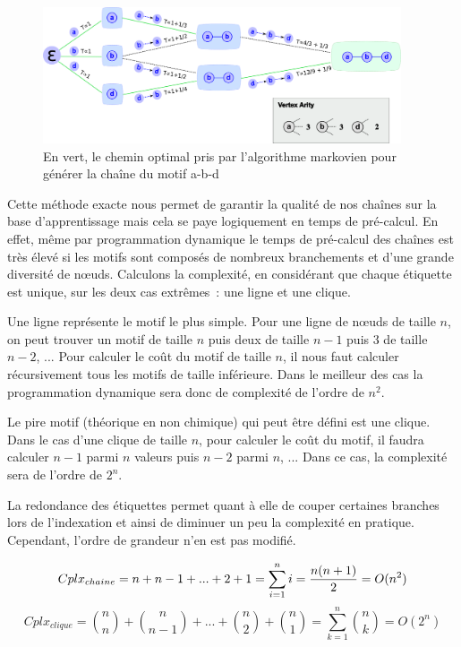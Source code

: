 \begin{figure}[!ht]
  \begin{center}
    \includegraphics[width=400px]{Figures/s2m/indexation/markov.png}
    \caption{\label{markov}En vert, le chemin optimal pris par l'algorithme markovien pour générer la chaîne du motif a-b-d}
  \end{center}
\end{figure}

Cette méthode exacte nous permet de garantir la qualité de nos chaînes sur la base d'apprentissage mais cela se paye logiquement en temps de pré-calcul.
En effet, même par programmation dynamique le temps de pré-calcul des chaînes est très élevé si les motifs sont composés de nombreux branchements et d'une grande diversité de n\oe{}uds.
Calculons la complexité, en considérant que chaque étiquette est unique, sur les deux cas extrêmes~: une ligne et une clique.

Une ligne représente le motif le plus simple.
Pour une ligne de n\oe{}uds de taille $n$, on peut trouver un motif de taille $n$ puis deux de taille $n-1$ puis 3 de taille $n-2$, ...
Pour calculer le coût du motif de taille $n$, il nous faut calculer récursivement tous les motifs de taille inférieure.
Dans le meilleur des cas la programmation dynamique sera donc de complexité de l'ordre de $n^2$.

Le pire motif (théorique en non chimique) qui peut être défini est une clique.
Dans le cas d'une clique de taille $n$, pour calculer le coût du motif, il faudra calculer $n-1$ parmi $n$ valeurs puis $n-2$ parmi $n$, ... Dans ce cas, la complexité sera de l'ordre de $2^n$.

La redondance des étiquettes permet quant à elle de couper certaines branches lors de l'indexation et ainsi de diminuer un peu la complexité en pratique.
Cependant, l'ordre de grandeur n'en est pas modifié.

\begin{equation}
 Cplx_{chaine} = n + n-1 + ... + 2 + 1 = \sum_{i=1}^n i = {{n (n+1)} \over 2} = O(n^2)
\end{equation}
\begin{equation}
 Cplx_{clique} = {n \choose n} + {n \choose n-1} + ... + {n \choose 2} + {n \choose 1} = \sum_{k=1}^n {n \choose k} = O(2^n)
\end{equation}


